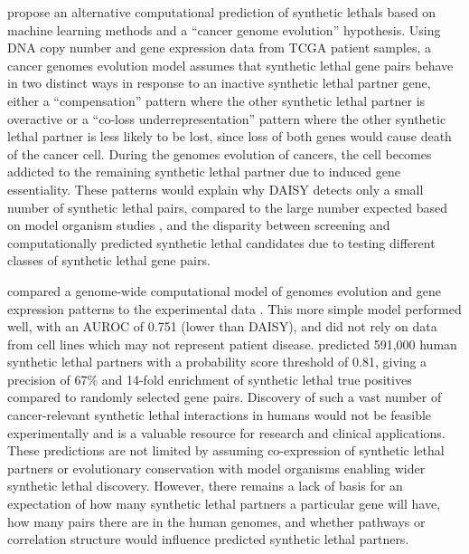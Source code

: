 \citet{Lu2015} propose an alternative computational prediction of \glspl{synthetic lethal} based on machine learning methods and a ``cancer genome evolution'' hypothesis. Using \acrshort{DNA} copy number and \gls{gene expression} data from \gls{TCGA} patient samples, a cancer \glspl{genome} evolution model assumes that \gls{synthetic lethal} gene pairs behave in two distinct ways in response to an inactive \gls{synthetic lethal} partner gene, either a ``compensation'' pattern where the other \gls{synthetic lethal} partner is overactive or a ``co-loss underrepresentation'' pattern where the other \gls{synthetic lethal} partner is less likely to be lost, since loss of both genes would cause death of the cancer cell. During the \glspl{genome} evolution of cancers, the cell becomes addicted to the remaining \gls{synthetic lethal} partner due to induced gene essentiality. These patterns would explain why \gls{DAISY} detects only a small number of \gls{synthetic lethal} pairs, compared to the large number expected based on model organism studies \citep{Boone2007}, and the disparity between screening and computationally predicted \gls{synthetic lethal} candidates due to testing different classes of \gls{synthetic lethal} gene pairs. 

\citet{Lu2015} compared a \gls{genome}-wide computational model of \glspl{genome} evolution and \gls{gene expression} patterns to the experimental data \citep{Vizeacoumar2013, Laufer2013}. This more simple model performed well, with an \gls{AUROC} of 0.751 (lower than \gls{DAISY}), and did not rely on data from cell lines which may not represent patient disease. \citet{Lu2015} predicted 591,000 human \gls{synthetic lethal} partners with a probability score threshold of 0.81, giving a precision of 67\% and 14-fold enrichment of \gls{synthetic lethal} true positives compared to randomly selected gene pairs. Discovery of such a vast number of cancer-relevant \gls{synthetic lethal} interactions in humans would not be feasible experimentally and is a valuable resource for research and clinical applications. These predictions are not limited by assuming co-expression of \gls{synthetic lethal} partners or evolutionary conservation with model organisms enabling wider \gls{synthetic lethal} discovery. However, there remains a lack of basis for an expectation of how many \gls{synthetic lethal} partners a particular gene will have, how many pairs there are in the human \glspl{genome}, and whether \glspl{pathway} or correlation structure would influence predicted \gls{synthetic lethal} partners. 

